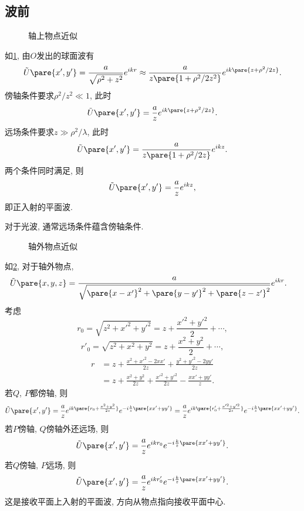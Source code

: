\documentclass{ctexart}
\begin{document}

\subsection{波前} %
\label{sub:波前}

\begin{figure}
    \centering
    \caption{轴上物点近似}
    \label{fig:轴上物点近似}
\end{figure}
如\cref{fig:轴上物点近似}, 由$O$发出的球面波有
\[ \tilde{U}\pare{x',y'} = \frac{a}{\sqrt{\rho^2 + z^2}}e^{ikr} \approx \frac{a}{z\pare{1+\rho^2/2z^2}}e^{ik\pare{z+\rho^2/2z}}. \]
傍轴条件要求$\rho^2/z^2 \ll 1$, 此时
\[ \tilde{U}\pare{x',y'} = \frac{a}{z}e^{ik\pare{z+\rho^2/2z}}. \]
远场条件要求$z\gg \rho^2/\lambda$, 此时
\[ \tilde{U}\pare{x',y'} = \frac{a}{z\pare{1+\rho^2/2z}}e^{ikz}. \]
两个条件同时满足, 则
\[ \tilde{U}\pare{x',y'} = \frac{a}{z}e^{ikz}, \]
即正入射的平面波.
\begin{remark}
    对于光波, 通常远场条件蕴含傍轴条件.
\end{remark}
\begin{figure}
    \centering
    \caption{轴外物点近似}
    \label{fig:轴外物点近似}
\end{figure}
如\cref{fig:轴外物点近似}, 对于轴外物点,
\begin{align*}
    \tilde{U}\pare{x,y,z} &= \frac{a}{\sqrt{\pare{x-x'}^2+\pare{y-y'}^2+\pare{z-z'}^2}}e^{ikr}.
\end{align*}
考虑
\[ r_0 = \sqrt{z^2 + x'^2 + y'^2} = z + \frac{x'^2+y'^2}{2} + \cdots, \]
\[ r'_0 = \sqrt{z^2 + x^2 + y^2} = z + \frac{x^2+y^2}{2} + \cdots, \]
\begin{align*}
    r &= z + \frac{x^2+x'^2 - 2xx'}{2z} + \frac{y^2+y'^2-2yy'}{2z}\\ &= z + \frac{x^2+y^2}{2z} + \frac{x'^2+y'^2}{2z} - \frac{xx'+yy'}{z}. 
\end{align*}
若$Q$, $P$都傍轴, 则
\[ \tilde{U}\pare{x',y'} = \frac{a}{z} e^{ik\pare{r_0 + \frac{x^2+y^2}{2z}}}e^{-i \frac{k}{z}\pare{xx'+yy'}} = \frac{a}{z} e^{ik\pare{r'_0 + \frac{x'^2+y'^2}{2z}}}e^{-i \frac{k}{z}\pare{xx'+yy'}}. \]
若$P$傍轴, $Q$傍轴外还远场, 则
\[ \tilde{U}\pare{x',y'} = \frac{a}{z}e^{ikr_0}e^{-i\frac{k}{z}\pare{xx'+yy'}}. \]
若$Q$傍轴, $P$远场, 则
\[ \tilde{U}\pare{x',y'} = \frac{a}{z}e^{ikr'_0}e^{-i\frac{k}{z}\pare{xx'+yy'}}. \]
这是接收平面上入射的平面波, 方向从物点指向接收平面中心.
\end{document}
